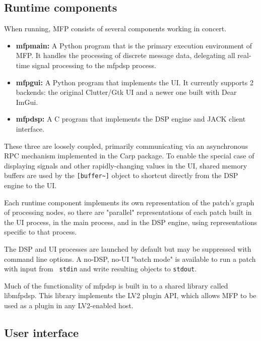 \documentclass[a4paper]{article}
\def\:{\hskip0pt}
\begin{document}
\subsection{Runtime components}

When running, MFP consists of several components working in concert.

\begin{itemize}
\item[]
{\bf mfpmain:} A Python program that is the primary execution
environment of MFP. It handles the processing of discrete
message data, delegating all real\:-\:time signal processing to the
mfpdsp process.

\item[]
{\bf mfpgui:} A Python program that implements the UI. It currently
supports 2 backends: the original Clutter/Gtk UI and a newer one
built with Dear ImGui.

\item[]
{\bf mfpdsp:} A C program that implements the DSP engine and JACK
client interface.
\end{itemize}

These three are loosely coupled, primarily communicating via an
asynchronous RPC mechanism implemented in the Carp
\cite{Gribble:Carp} package. To enable the special case of
displaying signals and other rapidly-changing values in the UI,
shared memory buffers are used by the {\tt [buffer\textasciitilde]} object to
shortcut directly from the DSP engine to the UI.

Each runtime component implements its own representation of the
patch's graph of processing nodes, so there are "parallel"
representations of each patch built in the UI process, in the
main process, and in the DSP engine, using representations
specific to that process.

The DSP and UI processes are launched by default but may be
suppressed with command line options. A no\:-\:DSP, no\:-\:UI
"batch mode" is available to run a patch with input from {\tt
stdin} and write resulting objects to {\tt stdout}.

Much of the functionality of mfpdsp is built in to a shared
library called libmfpdsp. This library implements the LV2
plugin API, which allows MFP to be used as a plugin in any
LV2-enabled host.

\subsection{User interface}
\end{document}
